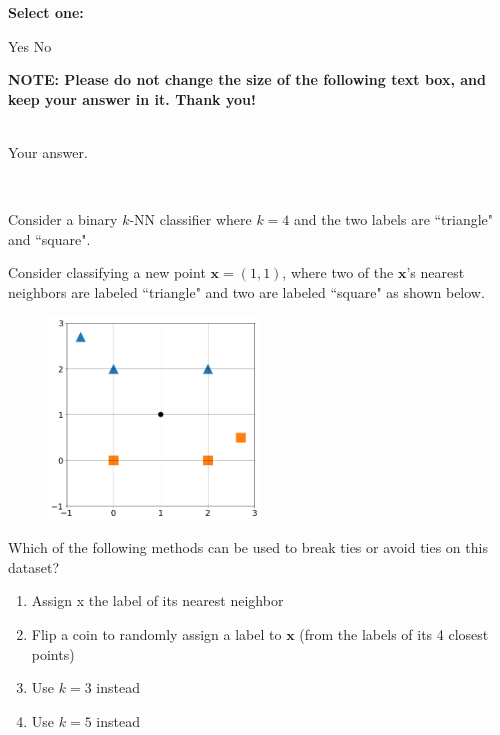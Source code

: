 \documentclass[11pt,addpoints,answers]{exam}
\numberwithin{equation}{section} %
\numberwithin{figure}{section} %
\numberwithin{table}{section} %
\newcommand{\xv}{\mathbf{x}}
\begin{document}
\begin{questions}
\begin{parts}
    \textbf{Select one:}
    \begin{checkboxes}
        \choice Yes
        \choice No
    \end{checkboxes}

    \textbf{NOTE: Please do not change the size of the following text box, and keep your answer in it. Thank you!} \\ \\
    \begin{tcolorbox}[fit,height=4cm, width=15cm, blank, borderline={1pt}{-2pt},nobeforeafter, top=2pt, left=2pt, right=2pt, bottom=2pt]
    \large
    Your answer.

    \end{tcolorbox} \\

    \end{parts}
    
    
    \question[3] Consider a binary $k$-NN classifier where $k=4$ and the two labels are ``triangle" and ``square".
    
    Consider classifying a new point $\xv =(1,1)$, where two of the $\xv$'s nearest neighbors are labeled ``triangle" and two are labeled ``square" as shown below.
    
    \begin{figure}[H]
        \centering
        \includegraphics[width = 0.5\textwidth]{1-1-5.png}
        \label{Q_5knn}
    \end{figure}
    
    Which of the following methods can be used to break ties or avoid ties on this dataset?
    
    \begin{enumerate}
        \item Assign x the label of its nearest neighbor
        \item Flip a coin to randomly assign a label to $\xv$ (from the labels of its 4 closest points)
        \item Use $k = 3$ instead
        \item Use $k = 5$ instead
    \end{enumerate}


\end{questions}
\end{document}
